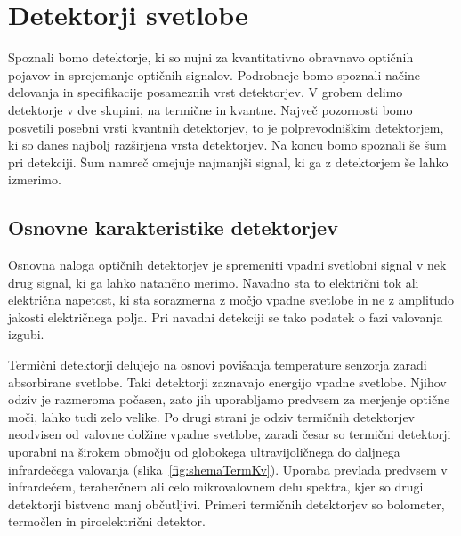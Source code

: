 
\chapter{Detektorji svetlobe}

Spoznali bomo detektorje, ki so nujni za kvantitativno obravnavo
optičnih pojavov in sprejemanje optičnih signalov. Podrobneje bomo spoznali
načine delovanja in specifikacije posameznih vrst detektorjev.
V grobem delimo detektorje v dve skupini, na termične in 
kvantne. Največ pozornosti bomo posvetili posebni vrsti kvantnih 
detektorjev, to je polprevodniškim detektorjem, ki so danes najbolj razširjena vrsta detektorjev.
Na koncu bomo spoznali še šum pri detekciji. Šum namreč omejuje najmanjši 
signal, ki ga z detektorjem še lahko izmerimo.

\section{Osnovne karakteristike detektorjev}
Osnovna naloga optičnih detektorjev je spremeniti vpadni svetlobni signal 
v nek drug signal, ki ga lahko natančno merimo. Navadno sta to električni tok 
ali električna napetost, ki sta sorazmerna z močjo vpadne svetlobe 
in ne z amplitudo jakosti električnega polja. Pri navadni detekciji se tako
podatek o fazi valovanja izgubi. 

Termični detektorji delujejo na osnovi povišanja temperature senzorja 
zaradi absorbirane svetlobe. Taki detektorji zaznavajo energijo 
vpadne svetlobe. Njihov odziv je razmeroma počasen, zato jih uporabljamo
predvsem za merjenje optične moči, lahko tudi zelo velike. 
Po drugi strani je odziv termičnih detektorjev neodvisen
od valovne dolžine vpadne svetlobe, zaradi česar so termični detektorji uporabni na 
širokem območju od globokega ultravijoličnega do daljnega infrardečega valovanja
(slika~\ref{fig:shemaTermKv}). 
Uporaba
prevlada predvsem v infrardečem, teraherčnem ali celo mikrovalovnem delu spektra, kjer so 
drugi detektorji bistveno manj občutljivi. 
Primeri termičnih detektorjev so bolometer, termočlen in piroelektrični detektor.

